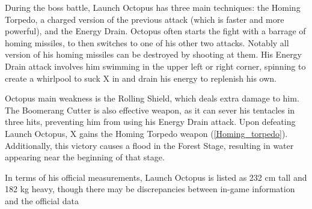 During the boss battle, Launch Octopus has three main techniques: the Homing Torpedo, a charged version of the previous attack (which is faster and more powerful), and the Energy Drain.  Octopus often starts the fight with a barrage of homing missiles, to then switches to one of his other two attacks. Notably all version of his homing missiles can be destroyed by shooting at them. His Energy Drain attack involves him swimming in the upper left or right corner, spinning to create a whirlpool to suck X in and drain his energy to replenish his own.

Octopus main weakness is the Rolling Shield, which deals extra damage to him. The Boomerang Cutter is also effective weapon, as it can sever his tentacles in three hits, preventing him from using his Energy Drain attack. Upon defeating Launch Octopus, X gains the Homing Torpedo weapon (\ref{Homing_torpedo}). Additionally, this victory causes a flood in the Forest Stage, resulting in water appearing near the beginning of that stage.

In terms of his official measurements, Launch Octopus is listed as 232 cm tall and 182 kg heavy\cite{wayback:X_resources}, though there may be discrepancies between in-game information and the official data~\cite{wiki:Launch_octopus}


